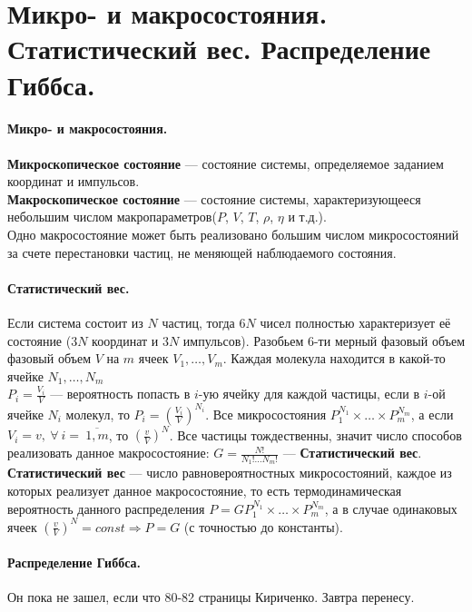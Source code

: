 \section{\normalsize Микро- и макросостояния. Статистический вес. Распределение Гиббса.}
\paragraph{Микро- и макросостояния.} \textbf{Микроскопическое состояние} --- состояние системы, определяемое заданием координат и импульсов.\\
\textbf{Макроскопическое состояние} --- состояние системы, характеризующееся небольшим числом макропараметров($P$, $V$, $T$, $\rho$, $\eta$ и т.д.).\\
Одно макросостояние может быть реализовано большим числом микросостояний за счете перестановки частиц, не меняющей наблюдаемого состояния.
\paragraph{Статистический вес.} Если система состоит из $N$ частиц, тогда $6N$ чисел полностью характеризует её состояние ($3N$ координат и $3N$ импульсов). Разобьем 6-ти мерный фазовый объем фазовый объем $V$ на $m$ ячеек $V_1,\ldots,V_m$. Каждая молекула находится в какой-то ячейке $N_1,\ldots,N_m$\\
$P_i=\frac{V_i}{V}$ --- вероятность попасть в $i$-ую ячейку для каждой частицы, если в $i$-ой ячейке $N_i$ молекул, то $P_i=\left(\frac{V_i}{V}\right)^{N_i}.$ Все микросостояния $P_1^{N_1}\times\ldots\times P_m^{N_m}$, а если $V_i=v,~\forall~i=~\overline{1,m}$, то $\left(\frac{v}{V}\right)^N$. Все частицы тождественны, значит число способов реализовать данное макросостояние: $G=\frac{N!}{N_1!\ldots N_m!}$ --- \textbf{Статистический вес}.\\
\textbf{Статистический вес} --- число равновероятностных микросостояний, каждое из которых реализует данное макросостояние, то есть термодинамическая вероятность данного распределения $P=GP_1^{N_1}\times\ldots\times P_m^{N_m}$, а в случае одинаковых ячеек $\left(\frac{v}{V}\right)^N=const\Rightarrow P=G$ (с точностью до константы).
\paragraph{Распределение Гиббса.} Он пока не зашел, если что 80-82 страницы Кириченко. Завтра перенесу.